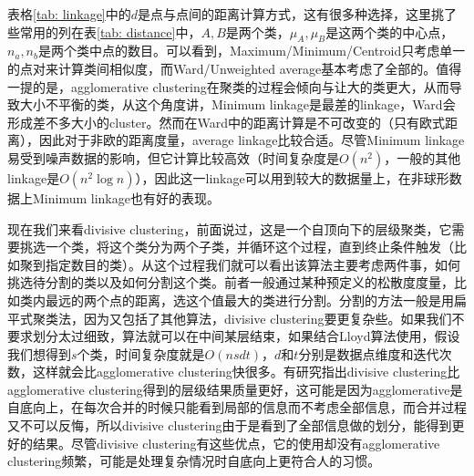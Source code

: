表格\ref{tab: linkage}中的$d$是点与点间的距离计算方式，这有很多种选择，这里挑了些常用的列在表\ref{tab: distance}中，$A,B$是两个类，$\mu_A,\mu_B$是这两个类的中心点，$n_a,n_b$是两个类中点的数目。可以看到，Maximum/Minimum/Centroid只考虑单一的点对来计算类间相似度，而Ward/Unweighted average基本考虑了全部的。值得一提的是，agglomerative clustering在聚类的过程会倾向与让大的类更大，从而导致大小不平衡的类，从这个角度讲，Minimum linkage是最差的linkage，Ward会形成差不多大小的cluster。然而在Ward中的距离计算是不可改变的（只有欧式距离），因此对于非欧的距离度量，average linkage比较合适。尽管Minimum linkage易受到噪声数据的影响，但它计算比较高效（时间复杂度是$O(n^2)$，一般的其他linkage是$O(n^2 \log n)$），因此这一linkage可以用到较大的数据量上，在非球形数据上Minimum linkage也有好的表现。

现在我们来看divisive clustering，前面说过，这是一个自顶向下的层级聚类，它需要挑选一个类，将这个类分为两个子类，并循环这个过程，直到终止条件触发（比如聚到指定数目的类）。从这个过程我们就可以看出该算法主要考虑两件事，如何挑选待分割的类以及如何分割这个类。前者一般通过某种预定义的松散度度量，比如类内最远的两个点的距离，选这个值最大的类进行分割。分割的方法一般是用扁平式聚类法，因为又包括了其他算法，divisive clustering要更复杂些。如果我们不要求划分太过细致，算法就可以在中间某层结束，如果结合Lloyd算法使用，假设我们想得到$s$个类，时间复杂度就是$O(nsdt)$，$d$和$t$分别是数据点维度和迭代次数，这样就会比agglomerative clustering快很多。有研究指出divisive clustering比 agglomerative clustering得到的层级结果质量更好，这可能是因为agglomerative是自底向上，在每次合并的时候只能看到局部的信息而不考虑全部信息，而合并过程又不可以反悔，所以divisive clustering由于是看到了全部信息做的划分，能得到更好的结果。尽管divisive clustering有这些优点，它的使用却没有agglomerative clustering频繁，可能是处理复杂情况时自底向上更符合人的习惯。

